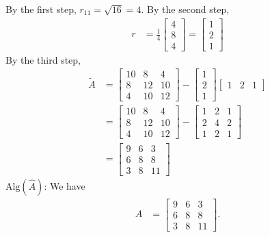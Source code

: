 \documentclass{report}
\begin{document}
    \bigbreak \noindent 
    By the first step, $r_{11} = \sqrt{16} = 4$.
    \bigbreak \noindent 
    By the second step, 
    \begin{align*}
        r &= \frac{1}{4}\begin{bmatrix} 4 \\ 8 \\ 4 \end{bmatrix} = \begin{bmatrix} 1 \\ 2\\ 1 \end{bmatrix}
    \end{align*}
    By the third step, 
    \begin{align*}
        \tilde{A} &= \begin{bmatrix} 10 & 8 & 4 \\ 8 & 12 & 10 \\ 4 & 10 & 12 \end{bmatrix} - \begin{bmatrix} 1 \\ 2 \\1 \end{bmatrix} \begin{bmatrix} 1 & 2 & 1 \end{bmatrix} \\
                  &= \begin{bmatrix} 10 & 8 & 4 \\ 8 & 12 & 10 \\ 4 & 10 & 12 \end{bmatrix} - \begin{bmatrix} 1 & 2 & 1 \\ 2 & 4 & 2 \\ 1 & 2 & 1 \end{bmatrix} \\
                  &= 
                  \begin{bmatrix}
                      9 & 6  &3 \\
                      6 & 8 & 8 \\
                      3 & 8 & 11
                  \end{bmatrix}
    \end{align*}
    $\text{Alg}(\hat{A})$: We have
    \begin{align*}
        A &=
                  \begin{bmatrix}
                      9 & 6  &3 \\
                      6 & 8 & 8 \\
                      3 & 8 & 11
                  \end{bmatrix}
    .\end{align*}
\end{document}
